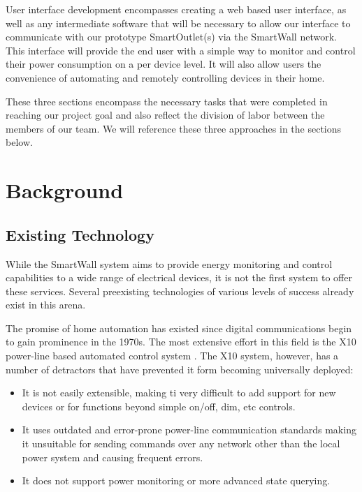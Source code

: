 \documentclass[12pt]{article}
\begin{document}
User interface development encompasses creating a web based user
interface, as well as any intermediate software that will be necessary
to allow our interface to communicate with our prototype
SmartOutlet(s) via the SmartWall network. This interface will provide
the end user with a simple way to monitor and control their power
consumption on a per device level. It will also allow users the
convenience of automating and remotely controlling devices in their home.

These three sections encompass the necessary tasks that were completed
in reaching our project goal and also reflect the division of labor
between the members of our team. We will reference these three
approaches in the sections below.

\section{Background}

\subsection{Existing Technology}

While the SmartWall system aims to provide energy monitoring and
control capabilities to a wide range of electrical devices, it is not the
first system to offer these services. Several preexisting technologies
of various levels of success already exist in this arena.

The promise of home automation has existed since digital communications
begin to gain prominence in the 1970s. The most extensive effort in this
field is the X10 power-line based automated control system
\cite{wiki-X10}. The X10 system, however, has a number of detractors
that have prevented it form becoming universally deployed:
\begin{itemize}
  \setlength{\itemsep}{0pt}
  \setlength{\parskip}{0pt}
  \setlength{\parsep}{0pt}
\item It is not easily extensible, making ti very difficult to add
  support for new devices or for functions beyond simple on/off, dim,
  etc controls.
\item It uses outdated and error-prone power-line communication
  standards making it unsuitable for sending commands over any network
  other than the local power system and causing frequent errors.
\item It does not support power monitoring or more advanced state querying.
\end{itemize}  
\end{document}

